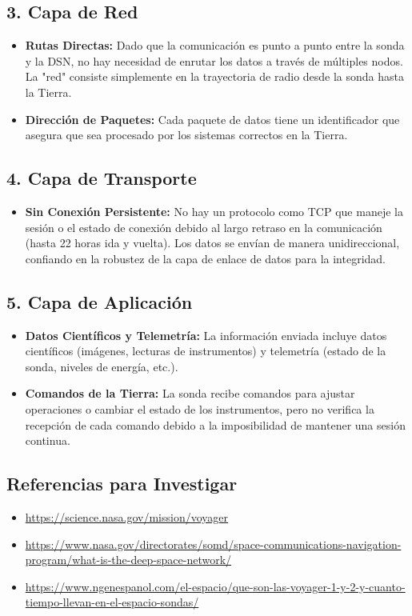 \documentclass[12pt]{report}
\begin{document}
\subsection*{3. Capa de Red}
\begin{itemize}
	\item \textbf{Rutas Directas:} Dado que la comunicación es punto a punto entre la sonda y la DSN, no hay necesidad de enrutar los datos a través de múltiples nodos. La "red" consiste simplemente en la trayectoria de radio desde la sonda hasta la Tierra.
	\item \textbf{Dirección de Paquetes:} Cada paquete de datos tiene un identificador que asegura que sea procesado por los sistemas correctos en la Tierra.
\end{itemize}

\subsection*{4. Capa de Transporte}
\begin{itemize}
	\item \textbf{Sin Conexión Persistente:} No hay un protocolo como TCP que maneje la sesión o el estado de conexión debido al largo retraso en la comunicación (hasta 22 horas ida y vuelta). Los datos se envían de manera unidireccional, confiando en la robustez de la capa de enlace de datos para la integridad.
\end{itemize}

\subsection*{5. Capa de Aplicación}
\begin{itemize}
	\item \textbf{Datos Científicos y Telemetría:} La información enviada incluye datos científicos (imágenes, lecturas de instrumentos) y telemetría (estado de la sonda, niveles de energía, etc.).
	\item \textbf{Comandos de la Tierra:} La sonda recibe comandos para ajustar operaciones o cambiar el estado de los instrumentos, pero no verifica la recepción de cada comando debido a la imposibilidad de mantener una sesión continua.
\end{itemize}

\subsection*{Referencias para Investigar}

	\begin{itemize}
		\item \url{https://science.nasa.gov/mission/voyager}
		\item \url{https://www.nasa.gov/directorates/somd/space-communications-navigation-program/what-is-the-deep-space-network/}
		\item \url{https://www.ngenespanol.com/el-espacio/que-son-las-voyager-1-y-2-y-cuanto-tiempo-llevan-en-el-espacio-sondas/}
	\end{itemize}
	
\end{document}
